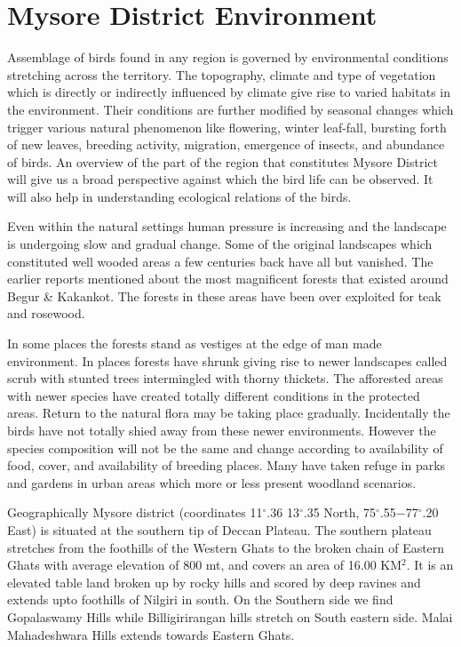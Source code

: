 \chapter{Mysore District Environment}

Assemblage of birds found in any region is governed by 
environmental conditions stretching across the territory. The 
topography, climate and type of vegetation which is directly or 
indirectly influenced by climate give rise to varied habitats in 
the environment. Their conditions are further modified by seasonal 
changes which trigger various natural phenomenon like flowering, 
winter leaf-fall, bursting forth of new leaves, breeding 
activity, migration, emergence of insects, and abundance of 
birds. An overview of the part of the region that constitutes 
Mysore District will give us a broad perspective against which 
the bird life can be observed. It will also help in understanding 
ecological relations of the birds. 

Even within the natural settings human pressure is increasing 
and the landscape is undergoing slow and gradual change. Some 
of the original landscapes which constituted well wooded areas a 
few centuries back have all but vanished. The earlier reports 
mentioned about the most magnificent forests that existed around 
Begur \& Kakankot. The forests in these areas have been over exploited 
for teak and rosewood. 

In some places the forests stand as vestiges at the edge of 
man made environment. In places forests have shrunk giving rise 
to newer landscapes called scrub with stunted trees intermingled 
with thorny thickets. The afforested areas with newer species 
have created totally different conditions in the protected areas. 
Return to the natural flora may be taking place gradually. Incidentally 
the birds have not totally shied away from these newer 
environments. However the species composition will not be the 
same and change according to availability of food, cover, and 
availability of breeding places. Many have taken refuge in parks 
and gardens in urban areas which more or less present woodland 
scenarios. 

Geographically Mysore district (coordinates 11$^\circ$.36 13$^\circ$.35 
North, 75$^\circ$.55$-$77$^\circ$.20 East) is situated at the southern tip of 
Deccan Plateau. The southern plateau stretches from the foothills 
of the Western Ghats to the broken chain of Eastern Ghats with 
average elevation of 800 mt, and covers an area of 16.00 KM$^2$. It 
is an elevated table land broken up by rocky hills and scored by 
deep ravines and extends upto foothills of Nilgiri in south. On 
the Southern side we find Gopalaswamy Hills while Billigirirangan 
hills stretch on South eastern side. Malai Mahadeshwara Hills 
extends towards Eastern Ghats. 


